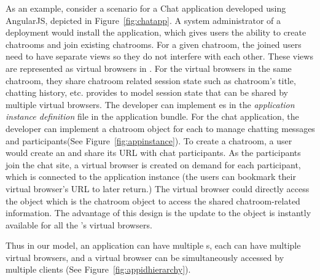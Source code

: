 \appinstancefig{}

As an example, consider a scenario for a Chat application developed using
AngularJS, depicted in Figure~\ref{fig:chatapp}. A system administrator of a
\cb deployment would install the application, which gives users the ability to
create chatrooms and join existing chatrooms. For a given chatroom, the joined
users need to have separate views so they do not interfere with each other.
These views are represented as virtual browsers in \cb. For the virtual
browsers in the same chatroom, they share chatroom related session state such
as chatroom's title, chatting history, etc. \cb provides \appins to model
session state that can be shared by multiple virtual browsers. The developer
can implement \appins{}es in the \emph{application instance
definition} file in the application bundle. For the chat application, the developer
can implement a chatroom object for each \appins  to manage chatting messages and
participants(See Figure~\ref{fig:appinstance}). 
To create a chatroom, a user would create an \appins{} and share
its URL with chat participants. As the participants join the chat site, a
virtual browser is created on demand for each participant, which is connected
to the application instance (the users can bookmark their virtual browser's
URL to later return.) The virtual browser could directly access the \appins
object which is the chatroom object to access the shared chatroom-related
information. The advantage of this design is the update to the \appins object
is instantly available for all the \appins{}'s virtual browsers.

\apphierarchyfig{}

Thus in our model, 
an application can have multiple \appins{}s,
each \appins{} can have multiple virtual browsers,
and a virtual browser can be simultaneously accessed by multiple clients
(See Figure~\ref{fig:appidhierarchy}).






